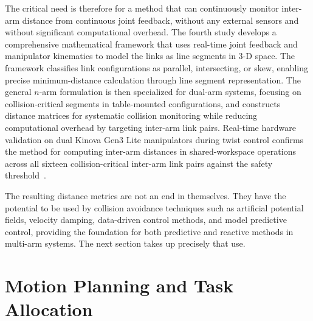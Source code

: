 The critical need is therefore for a method that can continuously monitor inter-arm distance from
continuous joint feedback, without any external sensors and without significant computational
overhead. The fourth study develops a comprehensive mathematical framework
that uses real-time joint feedback and manipulator kinematics to model the links as line segments in
3-D space. The framework classifies link configurations as parallel, intersecting, or skew, enabling
precise minimum-distance calculation through line segment representation. The general $n$-arm
formulation is then specialized for dual-arm systems, focusing on collision-critical segments in
table-mounted configurations, and constructs distance matrices for systematic collision monitoring
while reducing computational overhead by targeting inter-arm link pairs. Real-time hardware
validation on dual Kinova Gen3 Lite manipulators during twist control confirms the method for
computing inter-arm distances in shared-workspace operations across all sixteen collision-critical
inter-arm link pairs against the safety threshold~\citep{sk2025distance}.

The resulting distance metrics are not an end in themselves. They have the potential to be used by
collision avoidance techniques such as artificial potential fields, velocity damping, data-driven
control methods, and model predictive control, providing the foundation for both predictive and
reactive methods in multi-arm systems. The next section takes up precisely that use.

\section{Motion Planning and Task Allocation}\label{sec:intro_planning}

